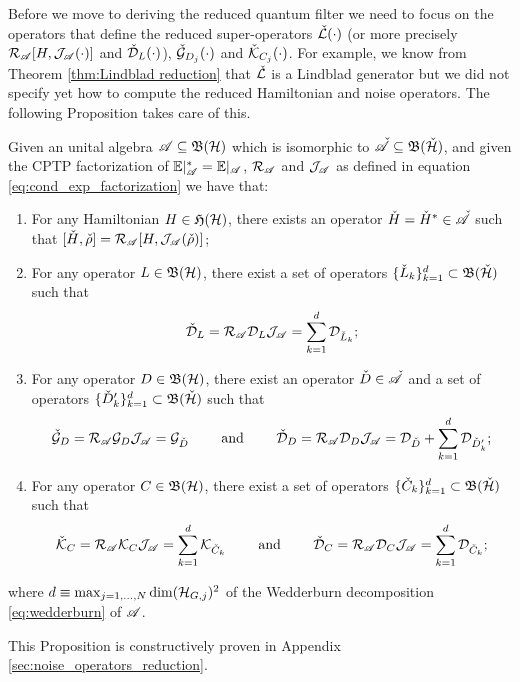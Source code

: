 \documentclass[aihp,12pt]{imsart}
\begin{document}
Before we move to deriving the reduced quantum filter we need to focus on the operators that define the reduced super-operators $\check{\mathcal{L}}(\cdot)$ (or more precisely $\mathcal{R}_{\mathscr{A}}[H,\mathcal{J}_{\mathscr{A}}(\cdot)]$  and $\check{\mathcal{D}}_L(\cdot)$), $\check{\mathcal{G}}_{D_j}(\cdot)$ and $\check{\mathcal{K}}_{C_j}(\cdot)$. For example, we know from Theorem \ref{thm:Lindblad reduction} that $\check{\mathcal{L}}$ is a Lindblad generator but we did not specify yet how to compute the reduced Hamiltonian and noise operators. The following Proposition takes care of this.
\begin{proposition}
\label{prop:operator_reduction}
    Given an unital algebra $\mathscr{A}\subseteq\mathfrak{B}(\mathcal{H})$ which is isomorphic to $\check{\mathscr{A}}\subseteq\mathfrak{B}(\check{\mathcal{H}})$, and given the CPTP factorization of $\mathbb{E}|_\mathscr{A}^* = \mathbb{E}|_{\mathscr{A}}$, $\mathcal{R}_{\mathscr{A}}$ and $\mathcal{J}_{\mathscr{A}}$ as defined in equation \eqref{eq:cond_exp_factorization} we have that:
    \begin{enumerate}
        \item For any Hamiltonian $H\in\mathfrak{H}(\mathcal{H})$, there exists an operator $\check{H} = \check{H}^*\in\check{\mathscr{A}}$ such that $[\check{H},\check{\rho}] = \mathcal{R}_{\mathscr{A}} [H,\mathcal{J}_{\mathscr{A}}(\check{\rho})]$;
        \item For any operator $L\in\mathfrak{B}(\mathcal{H})$, there exist a set of operators $\{\check{L}_k\}_{k=1}^d\subset\mathfrak{B}(\check{\mathcal{H}})$ such that       
        \[\check{\mathcal{D}}_{L} = \mathcal{R}_{\mathscr{A}} \mathcal{D}_{L} \mathcal{J}_{\mathscr{A}} = \sum_{k=1}^d \mathcal{D}_{\check{L}_k}; \]
        \item For any operator $D\in\mathfrak{B}(\mathcal{H})$, there exist an operator $\check{D}\in\check{\mathscr{A}}$ and a set of operators $\{\check{D}'_k\}_{k=1}^d\subset \mathfrak{B}(\check{\mathcal{H}})$ such that \[\check{\mathcal{G}}_{D} = \mathcal{R}_{\mathscr{A}} \mathcal{G}_D \mathcal{J}_{\mathscr{A}} = \mathcal{G}_{\check{D}} \qquad\text{ and }\qquad \check{\mathcal{D}}_{D} = \mathcal{R}_{\mathscr{A}} \mathcal{D}_{D} \mathcal{J}_{\mathscr{A}} = \mathcal{D}_{\check{D}} + \sum_{k=1}^d \mathcal{D}_{\check{D}'_k};\]
        \item For any operator $C\in\mathfrak{B}(\mathcal{H})$, there exist a set of operators $\{\check{C}_k\}_{k=1}^d\subset \mathfrak{B}(\check{\mathcal{H}})$ such that \[ \check{\mathcal{K}}_{C} = \mathcal{R}_{\mathscr{A}} \mathcal{K}_C \mathcal{J}_{\mathscr{A}} = \sum_{k=1}^d \mathcal{K}_{\check{C}_k} \qquad\text{ and }\qquad \check{\mathcal{D}}_{C} = \mathcal{R}_{\mathscr{A}} \mathcal{D}_{C} \mathcal{J}_{\mathscr{A}} = \sum_{k=1}^d \mathcal{D}_{\check{C}_k};\]
    \end{enumerate}
   where $d\equiv\max_{j=1,\dots,N} \dim(\mathcal{H}_{G,j})^2$ of the Wedderburn decomposition \eqref{eq:wedderburn} of $\mathscr{A}$.
\end{proposition}
This Proposition is constructively proven in Appendix \ref{sec:noise_operators_reduction}. 
\end{document}
